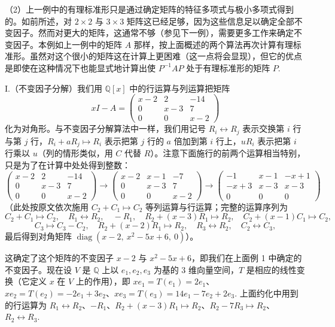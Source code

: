 \begin{example}
（2）上一例中的有理标准形只是通过确定矩阵的特征多项式与极小多项式得到的。如前所述，对 \(2 \times 2\) 与 \(3 \times 3\) 矩阵这已经足够，因为这些信息足以确定全部不变因子。然而对更大的矩阵，这通常不够（参见下一例），需要更多工作来确定不变因子。本例如上一例中的矩阵 \(A\) 那样，按上面概述的两个算法再次计算有理标准形。虽然对这个很小的矩阵这在计算上更困难（这一点将会显现），但它的优点是即使在这种情况下也能显式地计算出使 \(P^{-1}AP\) 处于有理标准形的矩阵 \(P\).

\noindent I.（不变因子分解）我们用 \(\mathbb{Q}[x]\) 中的行运算与列运算把矩阵
\[
xI-A = \begin{pmatrix} x-2 & 2 & -14 \\ 0 & x-3 & 7 \\ 0 & 0 & x-2 \end{pmatrix}
\]
化为对角形。与不变因子分解算法中一样，我们用记号 \(R_i \leftrightarrow R_j\) 表示交换第 \(i\) 行与第 \(j\) 行，\(R_i+aR_j \mapsto R_i\) 表示把第 \(j\) 行的 \(a\) 倍加到第 \(i\) 行上，\(uR_i\) 表示把第 \(i\) 行乘以 \(u\)（列的情形类似，用 \(C\) 代替 \(R\)）。注意下面施行的前两个运算相当特别，只是为了在计算中处处得到整数：
\[
\begin{pmatrix} x-2 & 2 & -14 \\ 0 & x-3 & 7 \\ 0 & 0 & x-2 \end{pmatrix} \longrightarrow \begin{pmatrix} x-2 & x-1 & -7 \\ 0 & x-3 & 7 \\ 0 & 0 & x-2 \end{pmatrix} \longrightarrow \begin{pmatrix} -1 & x-1 & -x+1 \\ -x+3 & x-3 & x-3 \\ 0 & 0 & 0 \end{pmatrix}
\]
（此处按原文依次施用 \(C_2+C_1 \mapsto C_2\) 等列运算与行运算；完整的运算序列为
\[
C_2+C_1 \mapsto C_2,\quad R_1 \leftrightarrow R_2,\quad -R_1,\quad R_2+(x-3)R_1 \mapsto R_2,\quad C_2+(x-1)C_1 \mapsto C_2,
\]
\[
C_3 \mapsto C_3-C_2,\quad R_2+(x-2)R_1 \mapsto R_2,\quad R_3 \leftrightarrow R_2,\quad C_2 \leftrightarrow C_3,
\]
最后得到对角矩阵 \(\operatorname{diag}(x-2,\ x^2-5x+6,\ 0)\)）。

这确定了这个矩阵的不变因子 \(x-2\) 与 \(x^2-5x+6\)，即我们在上面例 1 中确定的不变因子。现在设 \(V\) 是 \(\mathbb{Q}\) 上以 \(e_1, e_2, e_3\) 为基的 3 维向量空间，\(T\) 是相应的线性变换（它定义 \(x\) 在 \(V\) 上的作用），即 \(xe_1 = T(e_1) = 2e_1\)、\(xe_2 = T(e_2) = -2e_1+3e_2\)、\(xe_3 = T(e_3) = 14e_1-7e_2+2e_3\). 上面约化中用到的行运算为 \(R_1 \leftrightarrow R_2\)、\(-R_1\)、\(R_2+(x-3)R_1 \mapsto R_2\)、\(R_2-7R_3 \mapsto R_2\)、\(R_2 \leftrightarrow R_3\).


\end{example}
